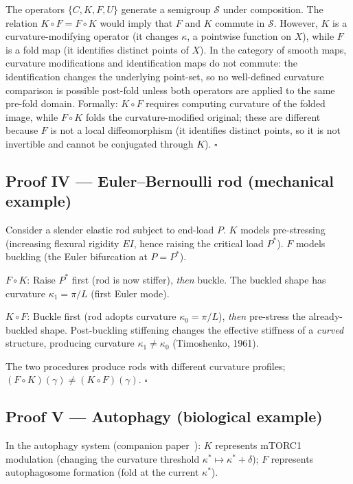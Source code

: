 \documentclass[14pt,a4paper]{extarticle}
\begin{document}
The operators $\{C, K, F, U\}$ generate a semigroup $\mathcal{S}$
under composition.  The relation $K \circ F = F \circ K$ would imply
that $F$ and $K$ commute in $\mathcal{S}$.
However, $K$ is a curvature-modifying operator (it changes $\kappa$,
a pointwise function on $X$), while $F$ is a fold map (it identifies
distinct points of $X$).  In the category of smooth maps, curvature
modifications and identification maps do not commute: the identification
changes the underlying point-set, so no well-defined curvature
comparison is possible post-fold unless both operators are applied
to the same pre-fold domain.
Formally: $K \circ F$ requires computing curvature of the folded image,
while $F \circ K$ folds the curvature-modified original;
these are different because $F$ is not a local diffeomorphism
(it identifies distinct points, so it is not invertible and cannot
be conjugated through $K$).  \hfill $\square$

\subsection*{Proof IV\; — Euler--Bernoulli rod (mechanical example)}

Consider a slender elastic rod subject to end-load $P$.
$K$ models pre-stressing (increasing flexural rigidity $EI$, hence
raising the critical load $P^*$).
$F$ models buckling (the Euler bifurcation at $P = P^*$).

\medskip\noindent
$F \circ K$: Raise $P^*$ first (rod is now stiffer), \emph{then} buckle.
The buckled shape has curvature $\kappa_1 = \pi/L$ (first Euler mode).

\noindent
$K \circ F$: Buckle first (rod adopts curvature $\kappa_0 = \pi/L$),
\emph{then} pre-stress the already-buckled shape.
Post-buckling stiffening changes the effective stiffness of a
\emph{curved} structure, producing curvature $\kappa_1 \ne \kappa_0$
(Timoshenko, 1961).

\medskip\noindent
The two procedures produce rods with different curvature profiles;
$(F\circ K)(\gamma) \ne (K\circ F)(\gamma)$.  \hfill $\square$

\subsection*{Proof V\; — Autophagy (biological example)}

In the autophagy system (companion paper~\cite{TOGT2026}):
$K$ represents mTORC1 modulation (changing the curvature threshold
$\kappa^* \mapsto \kappa^* + \delta$);
$F$ represents autophagosome formation (fold at the current $\kappa^*$).
\end{document}
